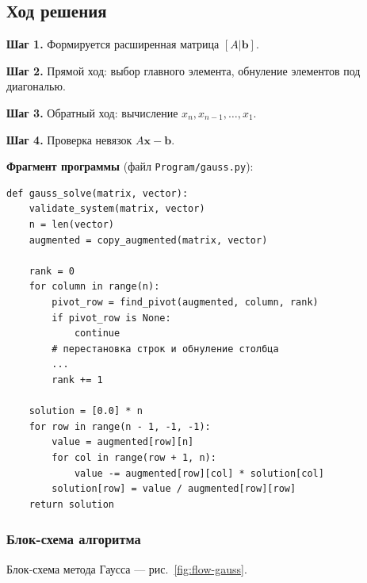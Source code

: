 \documentclass[12pt,a4paper]{scrartcl}
\begin{document}
\subsection{Ход решения}

\textbf{Шаг 1.} Формируется расширенная матрица $[A|\mathbf{b}]$.

\textbf{Шаг 2.} Прямой ход: выбор главного элемента, обнуление элементов под диагональю.

\textbf{Шаг 3.} Обратный ход: вычисление $x_n, x_{n-1}, \ldots, x_1$.

\textbf{Шаг 4.} Проверка невязок $A\mathbf{x}-\mathbf{b}$.

\textbf{Фрагмент программы} (файл \texttt{Program/gauss.py}):
\begin{verbatim}
def gauss_solve(matrix, vector):
    validate_system(matrix, vector)
    n = len(vector)
    augmented = copy_augmented(matrix, vector)

    rank = 0
    for column in range(n):
        pivot_row = find_pivot(augmented, column, rank)
        if pivot_row is None:
            continue
        # перестановка строк и обнуление столбца
        ...
        rank += 1

    solution = [0.0] * n
    for row in range(n - 1, -1, -1):
        value = augmented[row][n]
        for col in range(row + 1, n):
            value -= augmented[row][col] * solution[col]
        solution[row] = value / augmented[row][row]
    return solution
\end{verbatim}

\subsubsection{Блок-схема алгоритма}

Блок-схема метода Гаусса --- рис.~\ref{fig:flow-gauss}.
\end{document}
